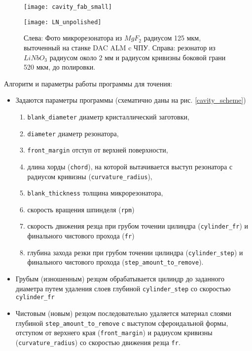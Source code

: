 \begin{figure}[ht]
  \begin{minipage}[ht]{0.49\linewidth}\centering
    \texttt{[image: cavity\_fab\_small]}
  \end{minipage}
  \hfill
  \begin{minipage}[ht]{0.25\linewidth}\centering
    \texttt{[image: LN\_unpolished]}
  \end{minipage}
  \caption{Слева: Фото микрорезонатора из $MgF_2$ радиусом 125 мкм, выточенный на станке DAC ALM c ЧПУ. Справа: резонатор из $LiNbO_3$ радиусом около 2 мм и радиусом кривизны боковой грани 520 мкм, до полировки.}
  \label{cavity_small}
\end{figure}



Алгоритм и параметры работы программы для точения:
\begin{itemize}
  \item Задаются параметры программы (схематично даны на рис. \ref{cavity_scheme})
  \begin{enumerate}
    \item \texttt{blank\_diameter} диаметр кристаллический заготовки,
    \item \texttt{diameter} диаметр резонатора,
    \item \texttt{front\_margin} отступ от верхней поверхности,
    \item длина хорды (\texttt{chord}), на которой вытачивается выступ резонатора с радиусом кривизны (\texttt{curvature\_radius}),
    \item \texttt{blank\_thickness} толщина микрорезонатора,
    \item скорость вращения шпинделя (\texttt{rpm})
    \item скорость движения резца при грубом точении цилиндра (\texttt{cylinder\_fr}) и финального чистового прохода (\texttt{fr})
    \item глубина захода резки при грубом точении цилиндра (\texttt{cylinder\_step}) и финального чистового прохода (\texttt{step\_amount\_to\_remove}).
  \end{enumerate}
  \item Грубым (изношенным) резцом обрабатывается цилиндр до заданного диаметра путем удаления слоев глубиной \texttt{cylinder\_step} со скоростью \texttt{cylinder\_fr}
  \item Чистовым (новым) резцом последовательно удаляется материал слоями глубиной \texttt{step\_amount\_to\_remove} с выступом сфероидальной формы, отступом от верхнего края (\texttt{front\_margin}) и радиусом кривизны (\texttt{curvature\_radius}) со скоростью движения резца \texttt{fr}.
\end{itemize}

